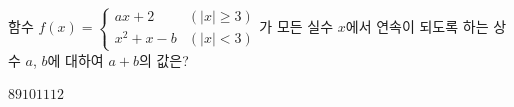 함수 $f(x)=\begin{cases} ax+2 & (|x|\ge 3) \\ x^2+x-b & (|x|<3) \end{cases}$가 모든 실수 $x$에서 연속이 되도록 하는 상수 $a$, $b$에 대하여 $a+b$의 값은?
\begin{choices32}{$8$}{$9$}{$10$}{$11$}{$12$}\end{choices32}
